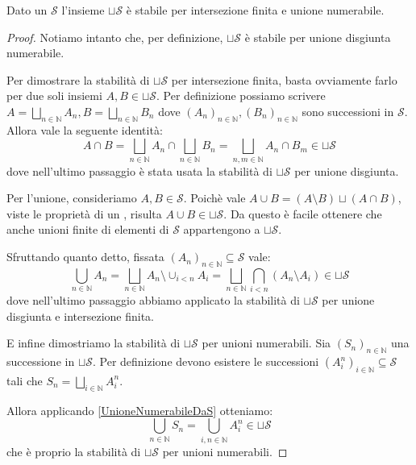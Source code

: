 \begin{proposition}\label{UnioneDisgiuntaQuasiAlgebra}
	Dato un \semiring{} $\mathcal S$ l'insieme $\sqcup\mathcal S$ è stabile per intersezione finita e unione numerabile.
\end{proposition}
\begin{proof}
	Notiamo intanto che, per definizione, $\sqcup\mathcal S$ è stabile per unione disgiunta numerabile.
	
	Per dimostrare la stabilità di $\sqcup\mathcal S$ per intersezione finita, basta ovviamente farlo per due soli insiemi $A,B\in\sqcup\mathcal S$. Per definizione possiamo scrivere $A=\bigsqcup_{n\in\mathbb N} A_n, B=\bigsqcup_{n\in\mathbb N} B_n$ dove $(A_n)_{n\in\mathbb N},(B_n)_{n\in\mathbb N}$ sono successioni in $\mathcal S$. Allora vale la seguente identità:
	\begin{equation*}
		A\cap B=\bigsqcup_{n\in\mathbb N} A_n\cap\bigsqcup_{n\in\mathbb N} B_n=
		\bigsqcup_{n,m\in\mathbb N} A_n\cap B_m\in\sqcup\mathcal S
	\end{equation*}
	dove nell'ultimo passaggio è stata usata la stabilità di $\sqcup\mathcal S$ per unione disgiunta.
	
	Per l'unione, consideriamo $A,B\in\mathcal S$. Poichè vale $A\cup B=(A\setminus B)\sqcup(A\cap B)$, viste le proprietà di un \semiring{}, risulta $A\cup B\in \sqcup\mathcal S$. Da questo è facile ottenere che anche unioni finite di elementi di $\mathcal S$ appartengono a $\sqcup\mathcal S$.
	
	Sfruttando quanto detto, fissata $(A_n)_{n\in\mathbb N}\subseteq\mathcal S$ vale:
	\begin{equation}\label{UnioneNumerabileDaS}
		\bigcup_{n\in\mathbb N} A_n=\bigsqcup_{n\in\mathbb N} A_n\setminus\cup_{i<n} A_i
		=\bigsqcup_{n\in\mathbb N} \bigcap_{i<n} (A_n\setminus A_i)\in\sqcup\mathcal S
	\end{equation}
	dove nell'ultimo passaggio abbiamo applicato la stabilità di $\sqcup\mathcal S$ per unione disgiunta e intersezione finita.
	
	E infine dimostriamo la stabilità di $\sqcup\mathcal S$ per unioni numerabili. Sia $(S_n)_{n\in\mathbb N}$ una successione in $\sqcup\mathcal S$. Per definizione devono esistere le successioni $(A^n_i)_{i\in\mathbb N}\subseteq \mathcal S$ tali che $S_n=\bigsqcup_{i\in\mathbb N} A^n_i$.
	
	Allora applicando \cref{UnioneNumerabileDaS} otteniamo:
	\begin{equation*}
		\bigcup_{n\in\mathbb N}S_n=\bigcup_{i,n\in\mathbb N}A^n_i\in\sqcup\mathcal S 
	\end{equation*}
	che è proprio la stabilità di $\sqcup\mathcal S$ per unioni numerabili.
\end{proof}

